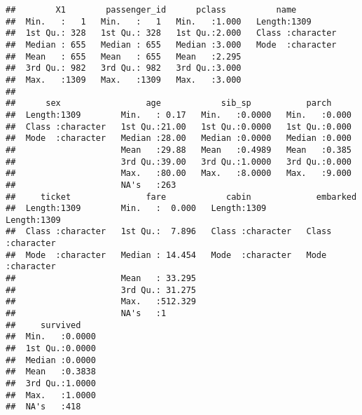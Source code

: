 \documentclass[
]{article}
\begin{document}
\begin{verbatim}
##        X1        passenger_id      pclass          name          
##  Min.   :   1   Min.   :   1   Min.   :1.000   Length:1309       
##  1st Qu.: 328   1st Qu.: 328   1st Qu.:2.000   Class :character  
##  Median : 655   Median : 655   Median :3.000   Mode  :character  
##  Mean   : 655   Mean   : 655   Mean   :2.295                     
##  3rd Qu.: 982   3rd Qu.: 982   3rd Qu.:3.000                     
##  Max.   :1309   Max.   :1309   Max.   :3.000                     
##                                                                  
##      sex                 age            sib_sp           parch      
##  Length:1309        Min.   : 0.17   Min.   :0.0000   Min.   :0.000  
##  Class :character   1st Qu.:21.00   1st Qu.:0.0000   1st Qu.:0.000  
##  Mode  :character   Median :28.00   Median :0.0000   Median :0.000  
##                     Mean   :29.88   Mean   :0.4989   Mean   :0.385  
##                     3rd Qu.:39.00   3rd Qu.:1.0000   3rd Qu.:0.000  
##                     Max.   :80.00   Max.   :8.0000   Max.   :9.000  
##                     NA's   :263                                     
##     ticket               fare            cabin             embarked        
##  Length:1309        Min.   :  0.000   Length:1309        Length:1309       
##  Class :character   1st Qu.:  7.896   Class :character   Class :character  
##  Mode  :character   Median : 14.454   Mode  :character   Mode  :character  
##                     Mean   : 33.295                                        
##                     3rd Qu.: 31.275                                        
##                     Max.   :512.329                                        
##                     NA's   :1                                              
##     survived     
##  Min.   :0.0000  
##  1st Qu.:0.0000  
##  Median :0.0000  
##  Mean   :0.3838  
##  3rd Qu.:1.0000  
##  Max.   :1.0000  
##  NA's   :418
\end{verbatim}
\end{document}
